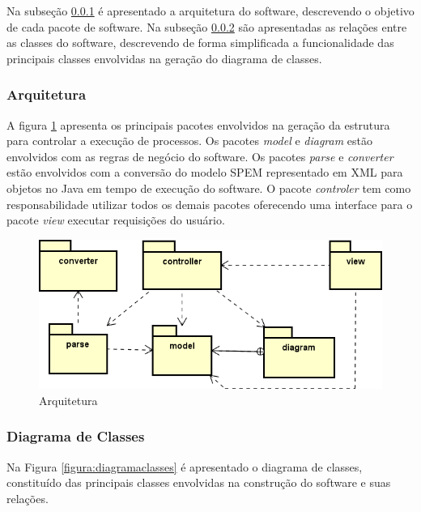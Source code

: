 Na subseção \ref{subsection:arquitetura} é apresentado a arquitetura do software, descrevendo o objetivo de cada pacote de software. Na subseção \ref{subsection:classes} são apresentadas as relações entre as classes do software, descrevendo de forma simplificada a funcionalidade das principais classes envolvidas na geração do diagrama de classes.

\subsubsection{Arquitetura}\label{subsection:arquitetura}
A figura \ref{figura:figuraArquitetura} apresenta os principais pacotes envolvidos na geração da estrutura para controlar a execução de processos. Os pacotes \textit{model} e \textit{diagram} estão envolvidos com as regras de negócio do software. Os pacotes \textit{parse} e \textit{converter} estão envolvidos com a conversão do modelo SPEM representado em XML para objetos no Java em tempo de execução do software.
O pacote \textit{controler} tem como responsabilidade utilizar todos os demais pacotes oferecendo uma interface para o pacote \textit{view} executar requisições do usuário. 

\begin{figure}[!htb]
	\caption{Arquitetura} \label{figura:figuraArquitetura}
	\begin{center}
		\includegraphics[scale=0.5]{img/ferramenta_arquitetura}
	\end{center}
\end{figure}
\subsubsection{Diagrama de Classes}\label{subsection:classes}
Na Figura \ref{figura:diagramaclasses} é apresentado o diagrama de classes, constituído das principais classes envolvidas na construção do software e suas relações. 

